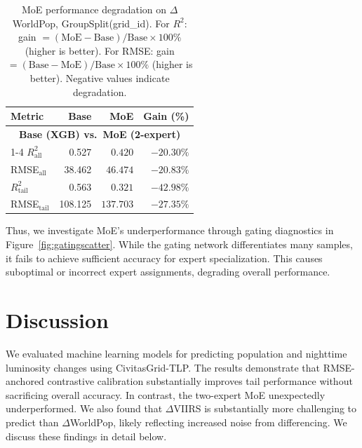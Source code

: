 \documentclass[11pt,conference,onecolumn]{IEEEtran}
\renewcommand{\arraystretch}{1.1} %
\begin{document}
\begin{table}[H]
\centering
\small
\setlength{\tabcolsep}{5pt}
\renewcommand{\arraystretch}{1.10}
\caption{MoE performance degradation on $\Delta$WorldPop, GroupSplit(grid\_id). For $R^2$: gain $= (\text{MoE}-\text{Base})/\text{Base} \times 100\%$ (higher is better). For RMSE: gain $= (\text{Base}-\text{MoE})/\text{Base} \times 100\%$ (higher is better). Negative values indicate degradation.}
\label{tab:dwp_gs_moe_drop}
\begin{tabular}{lrrr}
\toprule
\textbf{Metric} & \textbf{Base} & \textbf{MoE} & \textbf{Gain (\%)} \\
\midrule

\multicolumn{4}{c}{\textbf{Base (XGB) vs.\ MoE (2-expert)}} \\
\cmidrule(lr){1-4}
$R^2_{\mathrm{all}}$    & 0.527   & $0.420$  & $-20.30\%$ \\
RMSE$_{\mathrm{all}}$   & 38.462  & $46.474$   & $-20.83\%$ \\
$R^2_{\mathrm{tail}}$   & 0.563   & $0.321$  & $-42.98\%$ \\
RMSE$_{\mathrm{tail}}$  & 108.125 & $137.703$  & $-27.35\%$ \\

\bottomrule
\end{tabular}
\end{table}

Thus, we investigate MoE's underperformance through gating diagnostics in Figure~\ref{fig:gatingscatter}. While the gating network differentiates many samples, it fails to achieve sufficient accuracy for expert specialization. This causes suboptimal or incorrect expert assignments, degrading overall performance.

\section{Discussion}

We evaluated machine learning models for predicting population and nighttime luminosity changes using CivitasGrid-TLP. The results demonstrate that RMSE-anchored contrastive calibration substantially improves tail performance without sacrificing overall accuracy. In contrast, the two-expert MoE unexpectedly underperformed. We also found that $\Delta$VIIRS is substantially more challenging to predict than $\Delta$WorldPop, likely reflecting increased noise from differencing. We discuss these findings in detail below.
\end{document}
